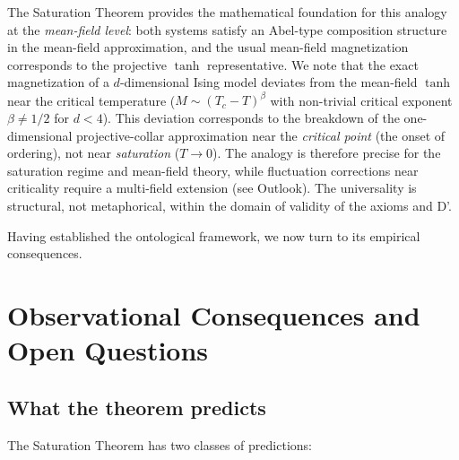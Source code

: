 \documentclass[aps,prd,twocolumn,superscriptaddress,nofootinbib]{revtex4-2}
\begin{document}
The Saturation Theorem provides the mathematical foundation for this analogy at the \textit{mean-field level}: both systems satisfy an Abel-type composition structure in the mean-field approximation, and the usual mean-field magnetization corresponds to the projective $\tanh$ representative. We note that the exact magnetization of a $d$-dimensional Ising model deviates from the mean-field $\tanh$ near the critical temperature ($M \sim (T_c - T)^{\beta}$ with non-trivial critical exponent $\beta \neq 1/2$ for $d < 4$). This deviation corresponds to the breakdown of the one-dimensional projective-collar approximation near the \textit{critical point} (the onset of ordering), not near \textit{saturation} ($T \to 0$). The analogy is therefore precise for the saturation regime and mean-field theory, while fluctuation corrections near criticality require a multi-field extension (see Outlook). The universality is structural, not metaphorical, within the domain of validity of the axioms and D'.

Having established the ontological framework, we now turn to its empirical consequences.

\section{Observational Consequences and Open Questions}
\label{sec:observational}

\subsection{What the theorem predicts}

The Saturation Theorem has two classes of predictions:
\end{document}
